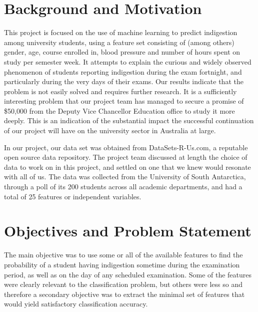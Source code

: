 \documentclass[12pt,a4paper]{article}
\begin{document}

	
	\newpage
	
	
	
	\tableofcontents
	\newpage
	\setcounter{page}{1}
	
	\section{Background and Motivation}\label{sec:intro}
	This project is focused on the use of machine learning to predict indigestion among university students, using a feature set consisting of (among others) gender, age, course enrolled in, blood pressure and number of hours spent on study per semester week. It attempts to explain the curious and widely observed phenomenon of students reporting indigestion during the exam fortnight, and particularly during the very days of their exams. Our results indicate that the problem is not easily solved and requires further research. It is a sufficiently interesting problem that our project team has managed to secure a promise of \$50,000 from the Deputy Vice Chancellor Education office to study it more deeply. This is an indication of the substantial impact the successful continuation of our project will have on the university sector in Australia at large.
	
	In our project, our data set was obtained from \textsf{DataSets-R-Us.com}, a reputable open source data repository. The project team discussed at length the choice of data to work on in this project, and settled on one that we knew would resonate with all of us. The data was collected from the University of South Antarctica, through a poll of its 200 students across all academic departments, and had a total of 25 features or independent variables.
	
	\section{Objectives and Problem Statement}\label{sec:prob}
	The main objective was to use some or all of the available features to find the probability of a student having indigestion sometime during the examination period, as well as on the day of any scheduled examination. Some of the features were clearly relevant to the classification problem, but others were less so and therefore a secondary objective was to extract the minimal set of features that would yield satisfactory classification accuracy.
	
\end{document}
